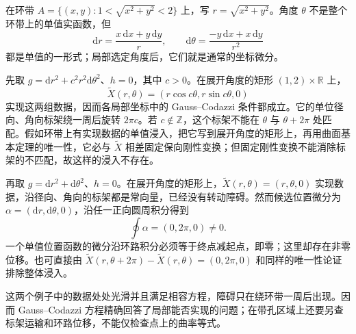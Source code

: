 \begin{example}
	\label{g1:exm:surface-monodromy-obstructions}
	在环带 \(A=\{(x,y):1<\sqrt{x^2+y^2}<2\}\) 上，写 \(r=\sqrt{x^2+y^2}\)。角度 \(\theta\) 不是整个环带上的单值实函数，但
	\[
		\mathrm{d}r=\frac{x\,\mathrm{d}x+y\,\mathrm{d}y}{r},\qquad
		\mathrm{d}\theta=\frac{-y\,\mathrm{d}x+x\,\mathrm{d}y}{r^2}
	\]
	都是单值的一形式；局部选定角度后，它们就是通常的坐标微分。

	先取 \(g=\mathrm{d}r^2+c^2r^2\mathrm{d}\theta^2\)、\(h=0\)，其中 \(c>0\)。在展开角度的矩形 \((1,2)\times\mathbb R\) 上，
	\[
		\widetilde X(r,\theta)=(r\cos c\theta,r\sin c\theta,0)
	\]
	实现这两组数据，因而各局部坐标中的 Gauss–Codazzi 条件都成立。它的单位径向、角向标架绕一周后旋转 \(2\pi c\)。若 \(c\notin\mathbb Z\)，这个标架不能在 \(\theta\) 与 \(\theta+2\pi\) 处匹配。假如环带上有实现数据的单值浸入，把它写到展开角度的矩形上，再用曲面基本定理的唯一性，它必与 \(\widetilde X\) 相差固定保向刚性变换；但固定刚性变换不能消除标架的不匹配，故这样的浸入不存在。

	再取 \(g=\mathrm{d}r^2+\mathrm{d}\theta^2\)、\(h=0\)。在展开角度的矩形上，\(\widetilde X(r,\theta)=(r,\theta,0)\) 实现数据，沿径向、角向的标架都是常向量，已经没有转动障碍。然而候选位置微分为 \(\alpha=(\mathrm{d}r,\mathrm{d}\theta,0)\)，沿任一正向圆周积分得到
	\[
		\oint\alpha=(0,2\pi,0)\ne0.
	\]
	一个单值位置函数的微分沿环路积分必须等于终点减起点，即零；这里却存在非零位移。也可直接由 \(\widetilde X(r,\theta+2\pi)-\widetilde X(r,\theta)=(0,2\pi,0)\) 和同样的唯一性论证排除整体浸入。
\end{example}

这两个例子中的数据处处光滑并且满足相容方程，障碍只在绕环带一周后出现。因而 Gauss–Codazzi 方程精确回答了局部能否实现的问题；在带孔区域上还要另查标架运输和环路位移，不能仅检查点上的曲率等式。
